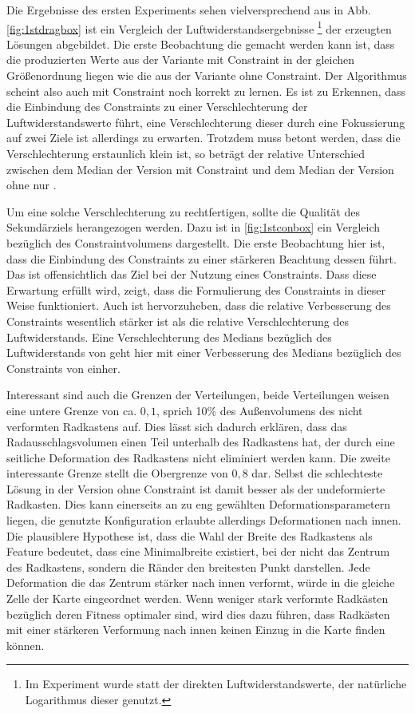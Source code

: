 Die Ergebnisse des ersten Experiments sehen vielversprechend aus in Abb. \cref{fig:1stdragbox} ist ein Vergleich der Luftwiderstandsergebnisse 
\footnote{Im Experiment wurde statt der direkten Luftwiderstandswerte, der natürliche Logarithmus dieser genutzt.} 
der erzeugten Lösungen abgebildet.
Die erste Beobachtung die gemacht werden kann ist, dass die produzierten Werte aus der Variante mit Constraint in der gleichen Größenordnung liegen wie die aus der Variante ohne Constraint.
Der Algorithmus scheint also auch mit Constraint noch korrekt zu lernen.
Es ist zu Erkennen, dass die Einbindung des Constraints zu einer Verschlechterung der Luftwiderstandswerte führt, eine Verschlechterung dieser durch eine Fokussierung auf zwei Ziele ist allerdings zu erwarten.
Trotzdem muss betont werden, dass die Verschlechterung erstaunlich klein ist, so beträgt der relative Unterschied zwischen dem Median der Version mit Constraint und dem Median der Version ohne nur .

Um eine solche Verschlechterung zu rechtfertigen, sollte die Qualität des Sekundärziels herangezogen werden.
Dazu ist in \cref{fig:1stconbox} ein Vergleich bezüglich des Constraintvolumens dargestellt.
Die erste Beobachtung hier ist, dass die Einbindung des Constraints zu einer stärkeren Beachtung dessen führt.
Das ist offensichtlich das Ziel bei der Nutzung eines Constraints. 
Dass diese Erwartung erfüllt wird, zeigt, dass die Formulierung des Constraints in dieser Weise funktioniert.
Auch ist hervorzuheben, dass die relative Verbesserung des Constraints wesentlich stärker ist als die relative Verschlechterung des Luftwiderstands.
Eine Verschlechterung des Medians bezüglich des Luftwiderstands von  geht hier mit einer Verbesserung des Medians bezüglich des Constraints von  einher.

Interessant sind auch die Grenzen der Verteilungen, beide Verteilungen weisen eine untere Grenze von ca. $0,1$, sprich 10\% des Außenvolumens des nicht verformten Radkastens auf.
Dies lässt sich dadurch erklären, dass das Radausschlagsvolumen einen Teil unterhalb des Radkastens hat, der durch eine seitliche Deformation des Radkastens nicht eliminiert werden kann.
Die zweite interessante Grenze stellt die Obergrenze von $0,8$ dar.
Selbst die schlechteste Lösung in der Version ohne Constraint ist damit besser als der undeformierte Radkasten.
Dies kann einerseits an zu eng gewählten Deformationsparametern liegen, die genutzte Konfiguration erlaubte allerdings Deformationen nach innen.
Die plausiblere Hypothese ist, dass die Wahl der Breite des Radkastens als Feature bedeutet, dass eine Minimalbreite existiert, bei der nicht das Zentrum des Radkastens, sondern die Ränder den breitesten Punkt darstellen.
Jede Deformation die das Zentrum stärker nach innen verformt, würde in die gleiche Zelle der Karte eingeordnet werden.
Wenn weniger stark verformte Radkästen bezüglich deren Fitness optimaler sind, wird dies dazu führen, dass Radkästen mit einer stärkeren Verformung nach innen keinen Einzug in die Karte finden können.

